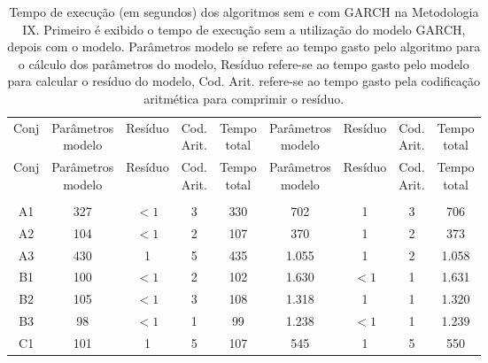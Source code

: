 \begin{center}
\begin{longtable}{ccccc|cccc}
\toprule
\rowcolor{white}
\caption[Metodologia IX: tempo de execução]{Tempo de execução (em segundos)
dos algoritmos sem e com GARCH na Metodologia IX. Primeiro é exibido o tempo de
execução sem a utilização do modelo GARCH, depois com o modelo. Parâmetros
modelo se refere ao tempo gasto pelo algoritmo para o cálculo dos parâmetros do
modelo, Resíduo refere-se ao tempo gasto pelo modelo para calcular o resíduo do
modelo, Cod. Arit. refere-se ao tempo gasto pela codificação aritmética para
comprimir o resíduo.} \label{tab:EvolucaoEntropiaMet9}\\
\midrule
Conj & \specialcell{Parâmetros\\modelo} &
Resíduo & \specialcell{Cod.\\Arit.} & \specialcell{Tempo\\total} &
\specialcell{Parâmetros\\modelo} &
Resíduo & \specialcell{Cod.\\Arit.} & \specialcell{Tempo\\total} \\
\midrule
\endfirsthead 
\midrule
\rowcolor{white}
Conj & \specialcell{Parâmetros\\modelo} &
Resíduo & \specialcell{Cod.\\Arit.} & \specialcell{Tempo\\total} &
\specialcell{Parâmetros\\modelo} &
Resíduo & \specialcell{Cod.\\Arit.} & \specialcell{Tempo\\total} \\
\toprule
\endhead
\midrule \\ %
\endfoot
\bottomrule 
\endlastfoot
A1&327&$<1$&3&330&702&1&3&706\\
A2&104&$<1$&2&107&370&1&2&373\\
A3&430&1&5&435&1.055&1&2&1.058\\
B1&100&$<1$&2&102&1.630&$<1$&1&1.631\\
B2&105&$<1$&3&108&1.318&1&1&1.320\\
B3&98&$<1$&1&99&1.238&$<1$&1&1.239\\
C1&101&1&5&107&545&1&5&550\\

\end{longtable}
\end{center}
